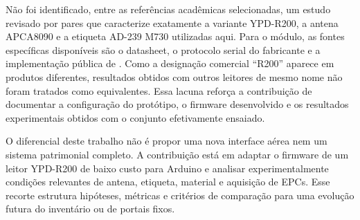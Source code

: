 Não foi identificado, entre as referências acadêmicas selecionadas, um estudo revisado por pares que caracterize exatamente a variante YPD-R200, a antena APCA8090 e a etiqueta AD-239 M730 utilizadas aqui. Para o módulo, as fontes específicas disponíveis são o datasheet, o protocolo serial do fabricante e a implementação pública de \mbox{}. Como a designação comercial ``R200'' aparece em produtos diferentes, resultados obtidos com outros leitores de mesmo nome não foram tratados como equivalentes. Essa lacuna reforça a contribuição de documentar a configuração do protótipo, o firmware desenvolvido e os resultados experimentais obtidos com o conjunto efetivamente ensaiado.

O diferencial deste trabalho não é propor uma nova interface aérea nem um sistema patrimonial completo. A contribuição está em adaptar o firmware de um leitor YPD-R200 de baixo custo para Arduino e analisar experimentalmente condições relevantes de antena, etiqueta, material e aquisição de EPCs. Esse recorte estrutura hipóteses, métricas e critérios de comparação para uma evolução futura do inventário ou de portais fixos.
